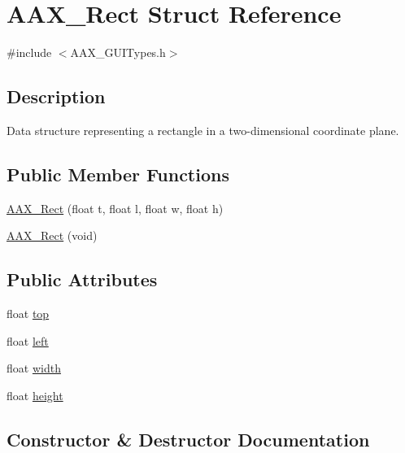 \hypertarget{a00120}{}\section{A\+A\+X\+\_\+\+Rect Struct Reference}
\label{a00120}


{\ttfamily \#include $<$A\+A\+X\+\_\+\+G\+U\+I\+Types.\+h$>$}



\subsection{Description}
Data structure representing a rectangle in a two-\/dimensional coordinate plane. \subsection*{Public Member Functions}
\begin{DoxyCompactItemize}
\item 
\hyperlink{a00120_a6ac06065390fe48a547aacf4de68e297}{A\+A\+X\+\_\+\+Rect} (float t, float l, float w, float h)
\item 
\hyperlink{a00120_a87743f1594fa99d12019861b95893316}{A\+A\+X\+\_\+\+Rect} (void)
\end{DoxyCompactItemize}
\subsection*{Public Attributes}
\begin{DoxyCompactItemize}
\item 
float \hyperlink{a00120_a49731e154df78f0811f271c83c56cdb3}{top}
\item 
float \hyperlink{a00120_a1975750fe0b144a6c6bf5495006e8088}{left}
\item 
float \hyperlink{a00120_a0105870bc2c8d461b76f67c73b9832f5}{width}
\item 
float \hyperlink{a00120_afee27da666682945c9cbfe2599f4ece4}{height}
\end{DoxyCompactItemize}


\subsection{Constructor \& Destructor Documentation}
\hypertarget{a00120_a6ac06065390fe48a547aacf4de68e297}{}
